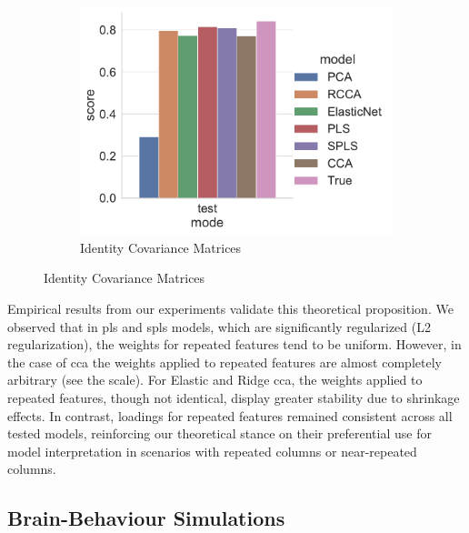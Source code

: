 \begin{figure}
\centering
\begin{subfigure}{0.49\linewidth}
\centering
\includegraphics[width=\linewidth]{figures/simulated/repeated/Train_Test_Scores_Identity_Covariance_implicit}
\caption{Identity Covariance Matrices}
\end{subfigure}
\end{figure}

Empirical results from our experiments validate this theoretical proposition.
We observed that in \acrshort{pls} and \acrshort{spls} models, which are significantly regularized (L2 regularization), the \gls{weights} for repeated features tend to be uniform.
However, in the case of \acrshort{cca} the \gls{weights} applied to repeated features are almost completely arbitrary (see the scale).
For Elastic and Ridge \acrshort{cca}, the \gls{weights} applied to repeated features, though not identical, display greater stability due to shrinkage effects.
In contrast, \gls{loadings} for repeated features remained consistent across all tested models, reinforcing our theoretical stance on their preferential use for model interpretation in scenarios with repeated columns or near-repeated columns.


\subsection{Brain-Behaviour Simulations}

